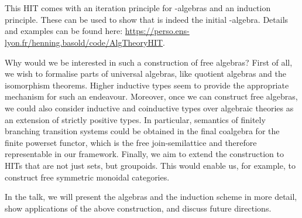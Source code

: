\documentclass{easychair}
\begin{document}
\begin{code}
\AgdaSpace{}%
\sig\AgdaSymbol{)}\AgdaSpace{}%
\AgdaSymbol{(}\AgdaSpace{}%
\AgdaSymbol{:}\AgdaSpace{}%
\AgdaSpace{}%
\sig\AgdaSpace{}%
\AgdaSpace{}%
\AgdaSpace{}%
\AgdaSpace{}%
\AgdaSymbol{)}\AgdaSpace{}%
\AgdaSpace{}%
\AgdaSpace{}%
\<%
\\
\>[6]%
\>[13]\AgdaSymbol{:}\AgdaSpace{}%
\AgdaSpace{}%
\AgdaSymbol{\{}\AgdaSpace{}%
\AgdaSymbol{\}}\AgdaSpace{}%
\AgdaSpace{}%
\AgdaSpace{}%
\AgdaSpace{}%
\AgdaSpace{}%
\AgdaSpace{}%
\AgdaSpace{}%
\AgdaSpace{}%
\AgdaOperator{\AgdaDatatype{==}}\AgdaSpace{}%
\AgdaSpace{}%
\<%
\\
%
\>[6]%
\>[13]\AgdaSymbol{:}\AgdaSpace{}%
\AgdaSpace{}%
\AgdaSymbol{(}\AgdaSpace{}%
\AgdaSymbol{)}\<%
\end{code}

This HIT comes with an iteration principle for -algebras and an
induction principle.
These can be used to show that  is indeed the initial
-algebra.
Details and examples can be found here:
\url{https://perso.ens-lyon.fr/henning.basold/code/AlgTheoryHIT}.

Why would we be interested in such a construction of free algebras?
First of all, we wish to formalise parts of universal algebras, like
quotient algebras and the isomorphism theorems.
Higher inductive types seem to provide the appropriate mechanism for such
an endeavour.
Moreover, once we can construct free algebras, we could also consider inductive
and coinductive types over algebraic theories as an extension of strictly
positive types.
In particular, semantics of finitely branching transition systems could be
obtained in the final coalgebra for the finite powerset functor, which is
the free join-semilattice and therefore representable in our framework.
Finally, we aim to extend the construction to HITs that are not just sets, but
groupoids.
This would enable us, for example, to construct free symmetric monoidal
categories.

In the talk, we will present the algebras and the induction scheme in more
detail, show applications of the above construction, and discuss future
directions.
\end{document}
